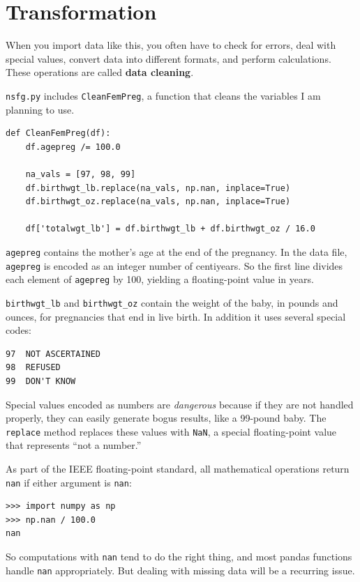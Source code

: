 \documentclass[12pt]{book}
\begin{document}
\section{Transformation}
\label{cleaning}

When you import data like this, you often have to check for errors,
deal with special values, convert data into different formats, and
perform calculations.  These operations are called {\bf data cleaning}.

{\tt nsfg.py} includes {\tt CleanFemPreg}, a function that cleans
the variables I am planning to use.

\begin{verbatim}
def CleanFemPreg(df):
    df.agepreg /= 100.0

    na_vals = [97, 98, 99]
    df.birthwgt_lb.replace(na_vals, np.nan, inplace=True)
    df.birthwgt_oz.replace(na_vals, np.nan, inplace=True)

    df['totalwgt_lb'] = df.birthwgt_lb + df.birthwgt_oz / 16.0    
\end{verbatim}

{\tt agepreg} contains the mother's age at the end of the
pregnancy.  In the data file, {\tt agepreg} is encoded as an integer
number of centiyears.  So the first line divides each element
of {\tt agepreg} by 100, yielding a floating-point value in
years.

\verb"birthwgt_lb" and \verb"birthwgt_oz" contain the weight of the
baby, in pounds and ounces, for pregnancies that end in live birth.
In addition it uses several special codes:

\begin{verbatim}
97	NOT ASCERTAINED
98	REFUSED	 
99	DON'T KNOW
\end{verbatim}

Special values encoded as numbers are {\em dangerous} because if they
are not handled properly, they can easily generate bogus results, like
a 99-pound baby.  The {\tt replace} method replaces these values with
{\tt NaN}, a special floating-point value that represents ``not a
number.''

As part of the IEEE floating-point standard, all mathematical
operations return {\tt nan} if either argument is {\tt nan}:

\begin{verbatim}
>>> import numpy as np
>>> np.nan / 100.0
nan
\end{verbatim}

So computations with {\tt nan} tend to do the right thing, and most
pandas functions handle {\tt nan} appropriately.  But dealing with
missing data will be a recurring issue.
\end{document}

